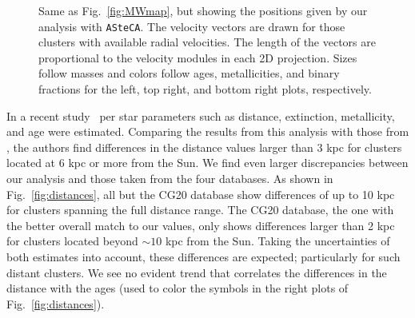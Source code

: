 \documentclass{aa}
\begin{document}
  \begin{figure}
   \caption{Same as Fig.~\ref{fig:MWmap}, but showing the positions given by our
   analysis with \texttt{ASteCA}. The velocity vectors are drawn for those
   clusters with available radial velocities. The length of the vectors are
   proportional to the velocity modules in each 2D projection. Sizes follow
   masses and colors follow ages, metallicities, and binary fractions for the
   left, top right, and bottom right plots, respectively.}
   \label{fig:MWmap_vectors}
  \end{figure}

  In a recent study~\citep{Anders_2022} per star parameters such as distance,
  extinction, metallicity, and age were estimated. Comparing the results
  from this analysis with those from \cite{Cantat_2020}, the authors find
  differences in the distance values larger than 3 kpc for clusters located at
  6 kpc or more from the Sun. We find even larger discrepancies between our
  analysis and those taken from the four databases. As shown in
  Fig.~\ref{fig:distances}, all but the CG20 database show differences of up
  to 10 kpc for clusters spanning the full distance range. The CG20
  database, the one with the better overall match to our values, only
  shows differences larger than 2 kpc for clusters located beyond
  $\sim10$ kpc from the Sun. Taking the uncertainties of both estimates
  into account, these differences are expected; particularly for such distant
  clusters.
  We see no evident trend that correlates the differences in the distance with
  the ages (used to color the symbols in the right plots of
  Fig.~\ref{fig:distances}).\\
\end{document}

